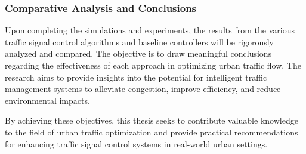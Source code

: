 \subsubsection{Comparative Analysis and Conclusions}
Upon completing the simulations and experiments, the results from the various traffic signal control algorithms and baseline controllers will be rigorously analyzed and compared. The objective is to draw meaningful conclusions regarding the effectiveness of each approach in optimizing urban traffic flow. The research aims to provide insights into the potential for intelligent traffic management systems to alleviate congestion, improve efficiency, and reduce environmental impacts.

By achieving these objectives, this thesis seeks to contribute valuable knowledge to the field of urban traffic optimization and provide practical recommendations for enhancing traffic signal control systems in real-world urban settings.
